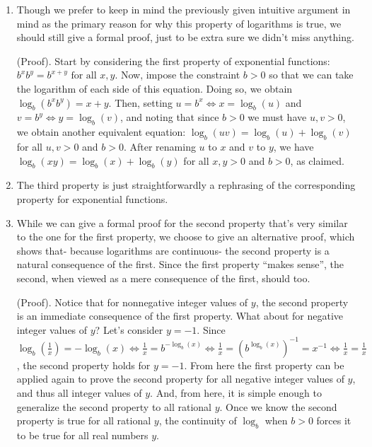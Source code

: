 \begin{enumerate}
    \item[1.] Though we prefer to keep in mind the previously given intuitive argument in mind as the primary reason for why this property of logarithms is true, we should still give a formal proof, just to be extra sure we didn't miss anything.
    
    (Proof). Start by considering the first property of exponential functions: $b^x b^y = b^{x + y} \text{ for all $x, y$}$. Now, impose the constraint $b > 0$ so that we can take the logarithm of each side of this equation. Doing so, we obtain $\log_b(b^x b^y) = x + y$. Then, setting $u = b^x \iff x = \log_b(u)$ and $v = b^y \iff y = \log_b(v)$, and noting that since $b > 0$ we must have $u, v > 0$, we obtain another equivalent equation: $\log_b(uv) = \log_b(u) + \log_b(v)$ for all $u, v > 0$ and $b > 0$. After renaming $u$ to $x$ and $v$ to $y$, we have $\log_b(xy) = \log_b(x) + \log_b(y)$ for all $x, y > 0$ and $b > 0$, as claimed.

    \item[3.] The third property is just straightforwardly a rephrasing of the corresponding property for exponential functions.
    
    \item[2.] While we can give a formal proof for the second property that's very similar to the one for the first property, we choose to give an alternative proof, which shows that- because logarithms are continuous- the second property is a natural consequence of the first. Since the first property ``makes sense'', the second, when viewed as a mere consequence of the first, should too.
    
    (Proof). Notice that for nonnegative integer values of $y$, the second property is an immediate consequence of the first property. What about for negative integer values of $y$? Let's consider $y = -1$. Since $\log_b(\frac{1}{x}) = -\log_b(x) \iff \frac{1}{x} = b^{-\log_b(x)} \iff \frac{1}{x} = (b^{\log_b(x)})^{-1} = x^{-1} \iff \frac{1}{x} = \frac{1}{x}$, the second property holds for $y = -1$. From here the first property can be applied again to prove the second property for all negative integer values of $y$, and thus all integer values of $y$. And, from here, it is simple enough to generalize the second property to all rational $y$. Once we know the second property is true for all rational $y$, the continuity of $\log_b$ when $b > 0$ forces it to be true for all real numbers $y$.
\end{enumerate}


